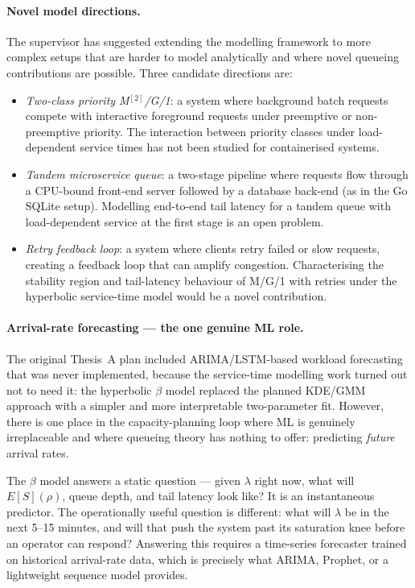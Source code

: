 \paragraph{Novel model directions.}
The supervisor has suggested extending the modelling framework to more complex setups that are harder to model analytically and where novel queueing contributions are possible. Three candidate directions are:
\begin{itemize}
    \item \emph{Two-class priority M$^{[2]}$/G/1}: a system where background batch requests compete with interactive foreground requests under preemptive or non-preemptive priority. The interaction between priority classes under load-dependent service times has not been studied for containerised systems.
    \item \emph{Tandem microservice queue}: a two-stage pipeline where requests flow through a CPU-bound front-end server followed by a database back-end (as in the Go SQLite setup). Modelling end-to-end tail latency for a tandem queue with load-dependent service at the first stage is an open problem.
    \item \emph{Retry feedback loop}: a system where clients retry failed or slow requests, creating a feedback loop that can amplify congestion. Characterising the stability region and tail-latency behaviour of M/G/1 with retries under the hyperbolic service-time model would be a novel contribution.
\end{itemize}

\paragraph{Arrival-rate forecasting — the one genuine ML role.}
The original Thesis~A plan included ARIMA/LSTM-based workload forecasting that was never implemented, because the service-time modelling work turned out not to need it: the hyperbolic $\beta$ model replaced the planned KDE/GMM approach with a simpler and more interpretable two-parameter fit. However, there is one place in the capacity-planning loop where ML is genuinely irreplaceable and where queueing theory has nothing to offer: predicting \emph{future} arrival rates.

The $\beta$ model answers a static question — given $\lambda$ right now, what will $E[S](\rho)$, queue depth, and tail latency look like? It is an instantaneous predictor. The operationally useful question is different: what will $\lambda$ be in the next 5--15 minutes, and will that push the system past its saturation knee before an operator can respond? Answering this requires a time-series forecaster trained on historical arrival-rate data, which is precisely what ARIMA, Prophet, or a lightweight sequence model provides.

